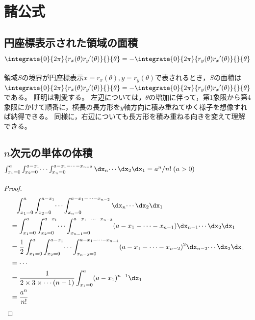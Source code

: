     \section{諸公式}
        \subsection{円座標表示された領域の面積\texorpdfstring{$\integrate{0}{2\pi}{r_x(\theta){r_y}'(\theta)}{}{\theta} = -\integrate{0}{2\pi}{r_y(\theta){r_x}'(\theta)}{}{\theta}$}{}}
            \label{円座標表示された領域の面積}
            領域$S$の境界が円座標表示$x = r_x(\theta), y = r_y(\theta)$で表されるとき，$S$の面積は$\integrate{0}{2\pi}{r_x(\theta){r_y}'(\theta)}{}{\theta} = -\integrate{0}{2\pi}{r_y(\theta){r_x}'(\theta)}{}{\theta}$である。
            証明は割愛する。
            左辺については，$\theta$の増加に伴って，第1象限から第4象限にかけて順番に，横長の長方形を$y$軸方向に積み重ねてゆく様子を想像すれば納得できる。
            同様に，右辺についても長方形を積み重ねる向きを変えて理解できる。
        \subsection{\texorpdfstring{$n$}{n}次元の単体の体積\texorpdfstring{$\int_{x_1=0}^a \int_{x_2=0}^{a-x_1} \dotsi \int_{x_n=0}^{a-x_1- \dotsb - x_{n-2}} \dx_n \dotsi \dx_2\dx_1 = a^n/n!\;(a>0)$}{}}
            \begin{proof}
                \begin{align*}
                    &\phantom{=} \int_{x_1=0}^a \int_{x_2=0}^{a-x_1} \dotsi \int_{x_n=0}^{a-x_1- \dotsb - x_{n-2}} \dx_n \dotsi \dx_2\dx_1 \\
                    &= \int_{x_1=0}^a \int_{x_2=0}^{a-x_1} \dotsi \int_{x_{n-1}=0}^{a-x_1- \dotsb - x_{n-3}} (a-x_1- \dotsb - x_{n-1}) \dx_{n-1} \dotsi \dx_2\dx_1 \\
                    &= \frac{1}{2}\int_{x_1=0}^a \int_{x_2=0}^{a-x_1} \dotsi \int_{x_{n-2}=0}^{a-x_1-\dotsb-x_{n-4}} (a-x_1- \dotsb - x_{n-2})^2 \dx_{n-2} \dotsi \dx_2\dx_1 \\
                    &= \dotsb \\
                    &= \frac{1}{2\times 3\times\dotsb(n-1)}\int_{x_1=0}^a (a-x_1)^{n-1} \dx_1 \\
                    &= \frac{a^n}{n!}
                \end{align*}
            \end{proof}